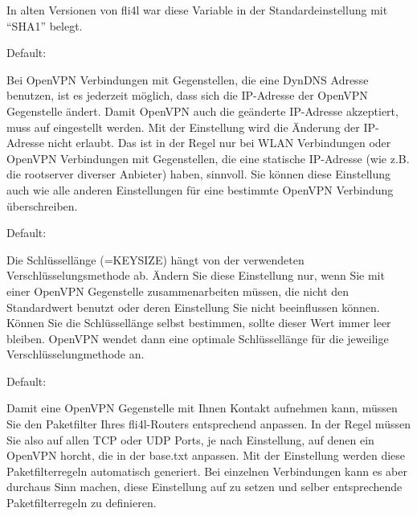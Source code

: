 \begin{description}

  In alten Versionen von fli4l war diese Variable in der Standardeinstellung mit
  ``SHA1'' belegt.


  Default: 

  Bei OpenVPN Verbindungen mit Gegenstellen, die eine DynDNS Adresse
  benutzen, ist es jederzeit möglich, dass sich die IP-Adresse der
  OpenVPN Gegenstelle ändert. Damit OpenVPN auch die geänderte
  IP-Adresse akzeptiert, muss  auf
   eingestellt werden. Mit der Einstellung  wird
  die Änderung der IP-Adresse nicht erlaubt. Das ist in der Regel nur
  bei WLAN Verbindungen oder OpenVPN Verbindungen mit Gegenstellen,
  die eine statische IP-Adresse (wie z.B. die rootserver diverser
  Anbieter) haben, sinnvoll. Sie können diese Einstellung auch wie
  alle anderen  Einstellungen für eine
  bestimmte OpenVPN Verbindung überschreiben.


  Default: 

  Die Schlüssellänge (=KEYSIZE) hängt von der verwendeten
  Verschlüsselungsmethode ab. Ändern Sie diese Einstellung nur, wenn
  Sie mit einer OpenVPN Gegenstelle zusammenarbeiten müssen, die nicht
  den Standardwert benutzt oder deren Einstellung Sie nicht
  beeinflussen können. Können Sie die Schlüssellänge selbst bestimmen,
  sollte dieser Wert immer leer bleiben. OpenVPN wendet dann eine
  optimale Schlüssellänge für die jeweilige Verschlüsselungmethode an.


  Default: 

  Damit eine OpenVPN Gegenstelle mit Ihnen Kontakt aufnehmen kann,
  müssen Sie den Paketfilter Ihres fli4l-Routers entsprechend
  anpassen. In der Regel müssen Sie also auf allen TCP oder UDP Ports,
  je nach  Einstellung, auf denen ein
  OpenVPN horcht, die  in der
  base.txt anpassen. Mit der Einstellung  werden diese
  Paketfilterregeln automatisch generiert. Bei einzelnen Verbindungen
  kann es aber durchaus Sinn machen, diese Einstellung auf 
  zu setzen und selber entsprechende Paketfilterregeln zu definieren.


\end{description}
